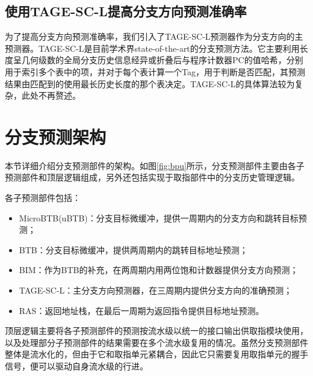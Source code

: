 \subsection{使用TAGE-SC-L提高分支方向预测准确率}
为了提高分支方向预测准确率，我们引入了TAGE-SC-L预测器\cite{seznec2014tage}作为分支方向的主预测器。TAGE-SC-L是目前学术界state-of-the-art的分支预测方法。它主要利用长度呈几何级数的全局分支历史信息经异或折叠后与程序计数器PC的值哈希，分别用于索引多个表中的项，并对于每个表计算一个Tag，用于判断是否匹配，其预测结果由匹配到的使用最长历史长度的那个表决定。TAGE-SC-L的具体算法较为复杂，此处不再赘述。

\section{分支预测架构}
本节详细介绍分支预测部件的架构。如图\ref{fig:bpu}所示，分支预测部件主要由各子预测部件和顶层逻辑组成，另外还包括实现于取指部件中的分支历史管理逻辑。

各子预测部件包括：
\begin{itemize}
    \item MicroBTB(uBTB)：分支目标微缓冲，提供一周期内的分支方向和跳转目标预测；
    \item BTB：分支目标微缓冲，提供两周期内的跳转目标地址预测；
    \item BIM：作为BTB的补充，在两周期内用两位饱和计数器提供分支方向预测；
    \item TAGE-SC-L：主分支方向预测器，在三周期内提供分支方向的准确预测；
    \item RAS：返回地址栈，在最后一周期为返回指令提供目标地址预测。
\end{itemize}

顶层逻辑主要将各子预测部件的预测按流水级以统一的接口输出供取指模块使用，以及处理部分子预测部件的结果需要在多个流水级复用的情况。虽然分支预测部件整体是流水化的，但由于它和取指单元紧耦合，因此它只需要复用取指单元的握手信号，便可以驱动自身流水级的行进。

